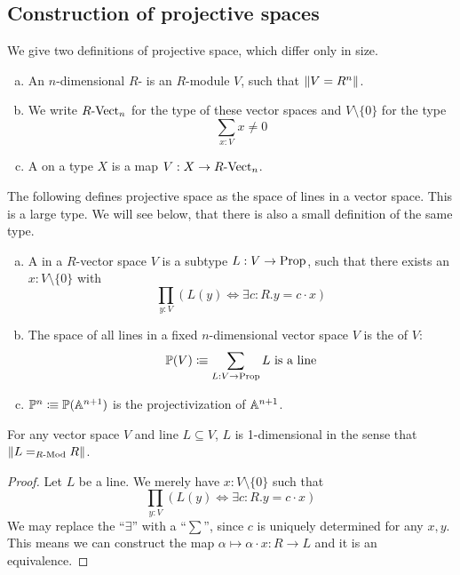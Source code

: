 
\subsection{Construction of projective spaces}
We give two definitions of projective space, which differ only in size.

\begin{definition}%
  \begin{enumerate}[(a)]
  \item An $n$-dimensional $R$- is an $R$-module $V$,
    such that $\lVert  V = R^n  \rVert$. 
  \item We write $R\text{-}\mathrm{Vect}_{n}$ for the type of these vector spaces and $V\setminus\{0\}$ for the type
    \[ \sum_{x:V}x\neq 0\]
  \item A  on a type $X$ is a map $V:X\to R\text{-}\mathrm{Vect}_{n}$. 
  \end{enumerate}
\end{definition}

The following defines projective space as the space of lines in a vector space.
This is a large type.
We will see below, that there is also a small definition of the same type.

\begin{definition}%
  \begin{enumerate}[(a)]
  \item   A  in a $R$-vector space $V$ is a subtype $L:V\to \mathrm{Prop}$,
    such that there exists an $x:V\setminus\{0\}$ with
    \[ \prod_{y:V}\left(L (y) \Leftrightarrow \exists c:R.y=c\cdot x\right)\]
  \item The space of all lines in a fixed $n$-dimensional vector space $V$ is the  of $V$:
    \[ \mathbb{P}(V)\vcentcolon\mspace{-1.2mu}\equiv \sum_{L:V\to \mathrm{Prop}} L \text{ is a line}  \]
  \item {} $\mathbb{P}^n \vcentcolon\mspace{-1.2mu}\equiv \mathbb{P}(\mathbb{A}^{n+1})$ is the projectivization of $\mathbb{A}^{n+1}$.
  \end{enumerate}
\end{definition}

\begin{proposition}%
  \label{lines-are-one-dimensional}
  For any vector space $V$ and line $L\subseteq V$,
  $L$ is 1-dimensional in the sense that $\lVert L=_{R\text{-}\mathrm{Mod}}R \rVert$.
\end{proposition}

\begin{proof}
  Let $L$ be a line.
  We merely have $x:V\setminus\{0\}$ such that 
  \[ \prod_{y:V}\left(L (y) \Leftrightarrow \exists c:R.y=c\cdot x\right)\]
  We may replace the ``$\exists$'' with a ``$\sum$'',
  since $c$ is uniquely determined for any $x,y$.
  This means we can construct the map $\alpha\mapsto \alpha\cdot x:R\to L$ and it is an equivalence.
\end{proof}

